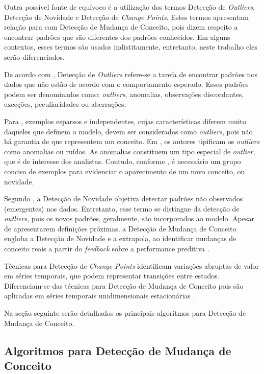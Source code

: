 \documentclass[qual, classic, a4paper]{ufbathesis}
\begin{document}
Outra possível fonte de equívoco é a utilização dos termos Detecção de \textit{Outliers}, Detecção de Novidade e Detecção de \textit{Change Points}.
Estes termos apresentam relação para com Detecção de Mudança de Conceito, pois dizem respeito a encontrar padrões que são diferentes dos padrões conhecidos.
Em alguns contextos, esses termos são usados indistitamente, entretanto, neste trabalho eles serão diferenciados.

De acordo com \cite{Chandola:2009:ADS:1541880.1541882}, 
Detecção de \textit{Outliers} refere-se a tarefa de encontrar padrões nos dados que não estão de acordo com o comportamento esperado.
Esses padrões podem ser denominados como: \textit{outliers}, anomalias, observações discordantes, exceções, peculiaridades ou aberrações.

Para \cite{Gama:2010:KDD:1855075}, exemplos esparsos e independentes, cujas características diferem muito daqueles que definem o modelo, 
devem ser considerados como \textit{outliers}, pois não há garantia de que representem um conceito. 
Em \cite{Aggarwal:2003:FCE:1315451.1315460}, os autores tipificam os \textit{outliers} como anomalias ou ruídos.
As anomalias constituem um tipo especial de \textit{outlier}, que é de interesse dos analistas.
Contudo, conforme \cite{Gama:2010:KDD:1855075}, é necessário um grupo conciso de exemplos para evidenciar o aparecimento de um novo conceito, ou novidade.

Segundo \cite{Chandola:2009:ADS:1541880.1541882}, a Detecção de Novidade objetiva detectar padrões não observados (emergentes) nos dados.
Entretanto, esse termo se distingue da detecção de \textit{outliers}, pois os novos padrões, geralmente, são incorporados ao modelo.
Apesar de apresentarem definições próximas, a Detecção de Mudança de Conceito engloba a Detecção de Novidade e a extrapola, ao identificar 
mudanças de conceito reais a partir do \textit{feedback} sobre a performance preditiva \cite{Gama:2010:KDD:1855075}.

Técnicas para Detecção de \textit{Change Points} identificam variações abruptas de valor em séries temporais, que podem representar transições entre estados.
Diferenciam-se das técnicas para Detecção de Mudança de Conceito pois são aplicadas em séries temporais unidimensionais estacionárias \cite{Aminikhanghahi:2017:SMT:3086013.3086037}.

Na seção seguinte serão detalhados os principais algoritmos para Detecção de Mudança de Conceito.

\subsection{Algoritmos para Detecção de Mudança de Conceito}
\end{document}
